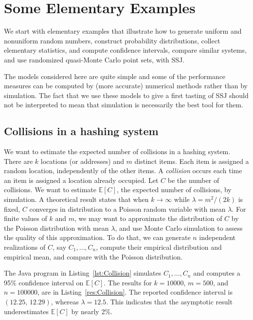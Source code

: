 
\section {Some Elementary Examples}
\label {sec:simple}

We start with elementary examples that illustrate how to
generate uniform and nonuniform random numbers,
construct probability distributions,
collect elementary statistics,
and compute confidence intervals,
compare similar systems,
and use randomized quasi-Monte Carlo point sets,
with SSJ.

The models considered here are quite simple and some of the
performance measures can be computed by (more accurate) numerical
methods rather than by simulation.
The fact that we use these models to give a first tasting of SSJ
should not be interpreted to mean that
simulation is necessarily the best tool for them.


\subsection{Collisions in a hashing system}
\label{sec:collision}

We want to estimate the expected number of collisions in a hashing system.
There are $k$ locations (or addresses) and $m$ distinct items.
Each item is assigned a random location, independently of the other items.
A \emph{collision} occurs each time an item is assigned a location already
occupied.  Let $C$ be the number of collisions.
We want to estimate $\mathbb{E}[C]$, the expected number of collisions, by simulation.
A theoretical result states that when $k\to\infty$ while $\lambda = m^2/(2k)$ is fixed,
$C$ converges in distribution to a Poisson random variable with mean $\lambda$.
For finite values of $k$ and $m$, we may want to approximate the distribution of $C$
by the Poisson distribution with mean $\lambda$, and
use Monte Carlo simulation to assess the quality of this approximation.
To do that, we can generate $n$ independent realizations of $C$, say $C_1,\dots,C_n$,
compute their empirical distribution and empirical mean, and compare with the
Poisson distribution.

The Java program in Listing~\ref{lst:Collision} simulates $C_1,\dots,C_n$
and computes a 95\%{} confidence interval on $\mathbb{E}[C]$.
The results for $k = 10000$, $m = 500$, and $n = 100000$, are in Listing~\ref{res:Collision}.
The reported confidence interval is $(12.25,\, 12.29)$, whereas $\lambda = 12.5$.
This indicates that the asymptotic result underestimates $\mathbb{E}[C]$ by nearly 2\%.


